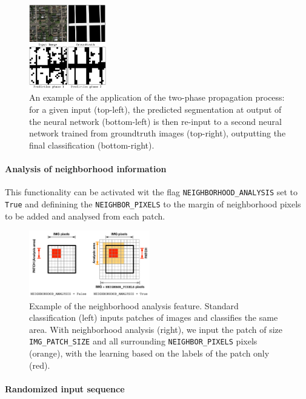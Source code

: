 \documentclass[fleqn,9 pt]{SelfArx} %
\begin{document}
\begin{sloppypar}
\begin{figure}[H]
\centering
\includegraphics[width=0.3\textwidth]{figures/two_phases_conv2d.pdf}
\caption{\small An example of the application of the two-phase propagation process: for a given input (top-left), the predicted segmentation at output of the neural network (bottom-left) is then re-input to a second neural network trained from groundtruth images (top-right), outputting the final classification (bottom-right).}
\end{figure}

\paragraph{Analysis of neighborhood information} This functionality can be activated wit the flag \texttt{NEIGHBORHOOD\_ANALYSIS} set to \texttt{True} and definining the \texttt{NEIGHBOR\_PIXELS} to the margin of neighborhood pixels to be added and analysed from each patch.

\begin{figure}[H]
\centering
\includegraphics[width=0.47\textwidth]{figures/NEIGHBORHOOD_ANALYSIS.pdf}
\caption{\small Example of the neighborhood analysis feature. Standard classification (left) inputs patches of images and classifies the same area. With neighborhood analysis (right), we input the patch of size \texttt{IMG\_PATCH\_SIZE} and all surrounding \texttt{NEIGHBOR\_PIXELS} pixels (orange), with the learning based on the labels of the patch only (red).}
\end{figure}

\paragraph{Randomized input sequence}


\end{sloppypar}
\end{document}
